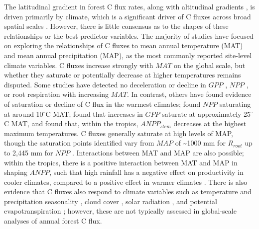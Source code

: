\documentclass[
]{article}
\begin{document}
The latitudinal gradient in forest C flux rates, along with altitudinal
gradients \citep{girardin_net_2010, malhi_variation_2017}, is driven
primarily by climate, which is a significant driver of C fluxes across
broad spatial scales
\citep{luyssaert_co_2007, cleveland_relationships_2011, wei_forest_2010}.
However, there is little consensus as to the shapes of these
relationships or the best predictor variables. The majority of studies
have focused on exploring the relationships of C fluxes to mean annual
temperature (MAT) and mean annual precipitation (MAP), as the most
commonly reported site-level climate variables. C fluxes increase
strongly with \(MAT\) on the global scale, but whether they saturate or
potentially decrease at higher temperatures remains disputed. Some
studies have detected no deceleration or decline in \(GPP\)
\citep{luyssaert_co_2007}, \(NPP\) \citep{schuur_productivity_2003}, or
root respiration \citep[\(R_{root}\);][]{wei_forest_2010} with
increasing \(MAT\). In contrast, others have found evidence of
saturation or decline of C flux in the warmest climates;
\citet{luyssaert_co_2007} found \(NPP\) saturating at around
10\(^\circ\)C MAT; \citet{larjavaara_temperature_2012} found that
increases in \(GPP\) saturate at approximately 25\(^\circ\)C MAT, and
\citet{sullivan_long-term_2020} found that, within the tropics,
\(ANPP_{stem}\) decreases at the highest maximum temperatures. C fluxes
generally saturate at high levels of MAP, though the saturation points
identified vary from \(MAP\) of \textasciitilde1000 mm for \(R_{root}\)
\citep{wei_forest_2010} up to 2,445 mm for \(NPP\)
\citep{schuur_productivity_2003}. Interactions between MAT and MAP are
also possible; within the tropics, there is a positive interaction
between MAT and MAP in shaping \(ANPP\), such that high rainfall has a
negative effect on productivity in cooler climates, compared to a
positive effect in warmer climates \citep{taylor_temperature_2017}.
There is also evidence that C fluxes also respond to climate variables
such as temperature and precipitation seasonality
\citep{wagner_climate_2016}, cloud cover
\citep{taylor_temperature_2017}, solar radiation
\citep{beer_terrestrial_2010, fyllas_solar_2017}, and potential
evapotranspiration \citep{kerkhoff_plant_2005}; however, these are not
typically assessed in global-scale analyses of annual forest C flux.
\end{document}
